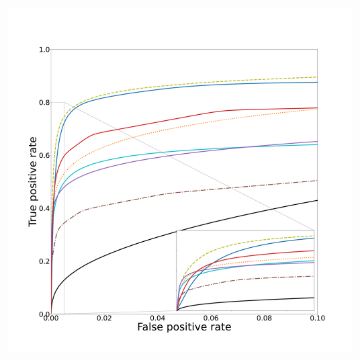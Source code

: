 \begin{figure}[!ht]
  \begin{subfigure}[t]{0.78\textwidth}
    \centering
    \includegraphics[width=\textwidth,clip = true, trim  =  125 125 180 200]{Images/Vascu_6_ROC.pdf}
\end{subfigure}
\begin{subfigure}[t]{0.2\textwidth}

\end{subfigure}
\end{figure}
